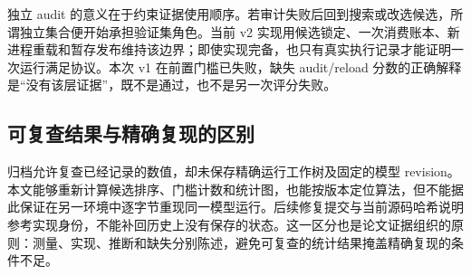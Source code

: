 独立 audit 的意义在于约束证据使用顺序。若审计失败后回到搜索或改选候选，所谓独立集合便开始承担验证集角色。当前 v2 实现用候选锁定、一次消费账本、新进程重载和暂存发布维持该边界；即使实现完备，也只有真实执行记录才能证明一次运行满足协议。本次 v1 在前置门槛已失败，缺失 audit/reload 分数的正确解释是“没有该层证据”，既不是通过，也不是另一次评分失败。

\subsection{可复查结果与精确复现的区别}

归档允许复查已经记录的数值，却未保存精确运行工作树及固定的模型 revision。本文能够重新计算候选排序、门槛计数和统计图，也能按版本定位算法，但不能据此保证在另一环境中逐字节重现同一模型运行。后续修复提交与当前源码哈希说明参考实现身份，不能补回历史上没有保存的状态。这一区分也是论文证据组织的原则：测量、实现、推断和缺失分别陈述，避免可复查的统计结果掩盖精确复现的条件不足。
